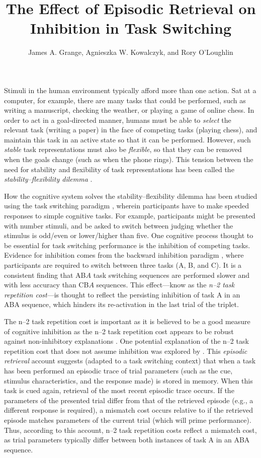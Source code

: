 \documentclass[a4paper, doc, natbib]{apa6}
\title{The Effect of Episodic Retrieval on Inhibition in Task Switching}
\author{James A. Grange, Agnieszka W. Kowalczyk, and Rory O'Loughlin}
\affiliation{School of Psychology, Keele University, UK}
\begin{document}
\maketitle

Stimuli in the human environment typically afford more than one action. Sat at a computer, for example, there are many tasks that could be performed, such as writing a manuscript, checking the weather, or playing a game of online chess. In order to act in a goal-directed manner, humans must be able to \emph{select} the relevant task (writing a paper) in the face of competing tasks (playing chess), and maintain this task in an active state so that it can be performed. However, such \emph{stable} task representations must also be \emph{flexible}, so that they can be removed when the goals change (such as when the phone rings). This tension between the need for stability and flexibility of task representations has been called the \emph{stability--flexibility dilemma} \citep{Goschke2000}. 

How the cognitive system solves the stability--flexibility dilemma has been studied using the task switching paradigm \citep{Grange2014a,Kiesel2010,Vandierendonck2010}, wherein participants have to make speeded responses to simple cognitive tasks. For example, participants might be presented with number stimuli, and be asked to switch between judging whether the stimulus is odd/even or lower/higher than five. One cognitive process thought to be essential for task switching performance is the inhibition of competing tasks. Evidence for inhibition comes from the backward inhibition paradigm \citep{Koch2010, Mayr2000}, where participants are required to switch between three tasks (A, B, and C).  It is a consistent finding that AB$A$ task switching sequences are performed slower and with less accuracy than CB$A$ sequences. This effect---know as the \emph{n--2 task repetition cost}---is thought to reflect the persisting inhibition of task A in an ABA sequence, which hinders its re-activation in the last trial of the triplet.

The n--2 task repetition cost is important as it is believed to be a good measure of cognitive inhibition as the n--2 task repetition cost appears to be robust against non-inhibitory explanations \citep{Mayr2007}. One potential explanation of the n--2 task repetition cost that does not assume inhibition was explored by \cite{Mayr2002}. This \emph{episodic retrieval} account \citep{Neill1997} suggests (adapted to a task switching context) that when a task has been performed an episodic trace of trial parameters (such as the cue, stimulus characteristics, and the response made) is stored in memory. When this task is cued again, retrieval of the most recent episodic trace occurs. If the parameters of the presented trial differ from that of the retrieved episode (e.g., a different response is required), a mismatch cost occurs relative to if the retrieved episode matches parameters of the current trial (which will prime performance). Thus, according to this account, n--2 task repetition costs reflect a mismatch cost, as trial parameters typically differ between both instances of task A in an ABA sequence.
\end{document}
